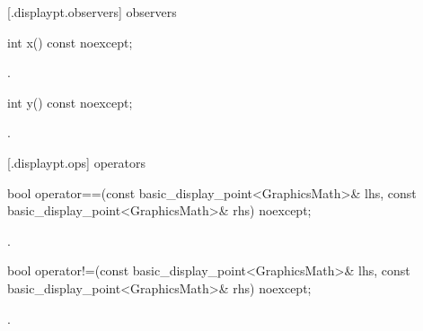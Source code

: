  [\iotwod.displaypt.observers]{ observers}

%
\begin{itemdecl}
int x() const noexcept;
\end{itemdecl}
\begin{itemdescr}
\pnum
\returns
{}.
\end{itemdescr}

%
\begin{itemdecl}
int y() const noexcept;
\end{itemdecl}
\begin{itemdescr}
\pnum
\returns
{}.
\end{itemdescr}

 [\iotwod.displaypt.ops] { operators}

%
\begin{itemdecl}
bool operator==(const basic_display_point<GraphicsMath>& lhs,
  const basic_display_point<GraphicsMath>& rhs) noexcept;
\end{itemdecl}
\begin{itemdescr}
\pnum
\returns
{}.
\end{itemdescr}

%
\begin{itemdecl}
bool operator!=(const basic_display_point<GraphicsMath>& lhs,
  const basic_display_point<GraphicsMath>& rhs) noexcept;
\end{itemdecl}
\begin{itemdescr}
\pnum
\returns
{}.
\end{itemdescr}
